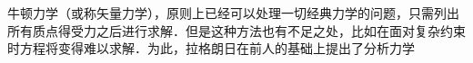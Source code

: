 

牛顿力学（或称矢量力学），原则上已经可以处理一切经典力学的问题，只需列出所有质点得受力之后进行求解．但是这种方法也有不足之处，比如在面对复杂约束时方程将变得难以求解．为此，拉格朗日在前人的基础上提出了分析力学